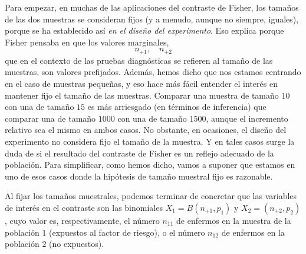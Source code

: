 Para empezar, en muchas de las aplicaciones del contraste de Fisher, los tamaños de las dos muestras se consideran fijos (y a menudo, aunque no siempre, iguales), porque se ha establecido así {\em en el diseño del experimento}.  Eso explica porque Fisher pensaba en que los valores marginales,
      \[n_{+1},\quad n_{+2}\]
que en el contexto de las pruebas diagnósticas se refieren al tamaño de las muestras, son valores prefijados. Además, hemos dicho que nos estamos centrando en el caso de muestras pequeñas, y eso hace más fácil entender el interés en mantener fijo el tamaño de las muestras. Comparar una muestra de tamaño $10$ con  una de tamaño $15$ es más arriesgado (en términos de inferencia) que  comparar una de tamaño $1000$ con una de tamaño $1500$, aunque el incremento relativo sea el mismo en ambos casos. No obstante, en ocasiones, el diseño del experimento no considera fijo el tamaño de la muestra. Y en tales casos surge la duda de si el resultado del contraste de Fisher es un reflejo adecuado de la población. Para simplificar, como hemos dicho, vamos a suponer que estamos en uno de esos casos donde la hipótesis de tamaño muestral fijo es razonable.

Al fijar los tamaños muestrales, podemos terminar de concretar que las variables de interés en el contraste son las binomiales $X_1=B(n_{+1},p_1)$ y $X_2=(n_{+2},p_2)$, cuyo valor es, respectivamente, el número $n_{11}$ de enfermos en la muestra de la población $1$ (expuestos al factor de riesgo), o el número $n_{12}$ de enfermos en la población $2$ (no expuestos).


